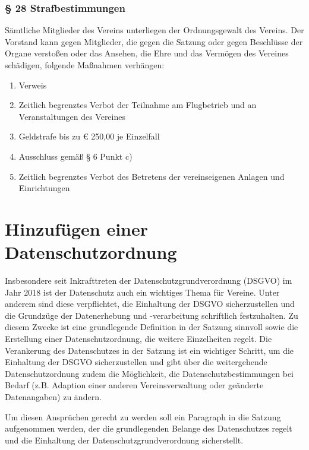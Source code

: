 \documentclass[10pt,a4paper,parskip=half]{scrartcl}
\newcommand{\change}[1]{
  \begin{adjustwidth}{20pt}{20pt}
    #1
  \end{adjustwidth}
}
\begin{document}
  \change{
    \subsubsection*{§ 28 Strafbestimmungen}
    Sämtliche Mitglieder des Vereins unterliegen der Ordnungsgewalt des Vereins.
    Der Vorstand kann gegen Mitglieder,
    die gegen die Satzung oder gegen Beschlüsse der Organe verstoßen oder das Ansehen,
    die Ehre und das Vermögen des Vereines schädigen,
    folgende Maßnahmen verhängen:
    \begin{enumerate}[label=\alph*),noitemsep]
      \item Verweis
      \item Zeitlich begrenztes Verbot der Teilnahme am Flugbetrieb und an Veranstaltungen des Vereines
      \item Geldstrafe bis zu € 250,00 je Einzelfall
      \item Ausschluss gemäß § 6 Punkt c)
      \item Zeitlich begrenztes Verbot des Betretens der vereinseigenen Anlagen und Einrichtungen
    \end{enumerate}
  }

  \section{Hinzufügen einer Datenschutzordnung}
  Insbesondere seit Inkrafttreten der Datenschutzgrundverordnung (DSGVO) im Jahr 2018 ist der Datenschutz auch ein wichtiges Thema für Vereine. Unter anderem sind diese verpflichtet, die Einhaltung der DSGVO sicherzustellen und die Grundzüge der Datenerhebung und -verarbeitung schriftlich festzuhalten. Zu diesem Zwecke ist eine grundlegende Definition in der Satzung sinnvoll sowie die Erstellung einer Datenschutzordnung, die weitere Einzelheiten regelt. Die Verankerung des Datenschutzes in der Satzung ist ein wichtiger Schritt,  um die Einhaltung der DSGVO sicherzustellen und gibt über die weitergehende Datenschutzordnung zudem die Möglichkeit, die Datenschutzbestimmungen bei Bedarf (z.B. Adaption einer anderen Vereinsverwaltung oder geänderte Datenangaben) zu ändern.

  Um diesen Ansprüchen gerecht zu werden soll ein Paragraph in die Satzung aufgenommen werden, der die grundlegenden Belange des Datenschutzes regelt und die Einhaltung der Datenschutzgrundverordnung sicherstellt.
\end{document}
